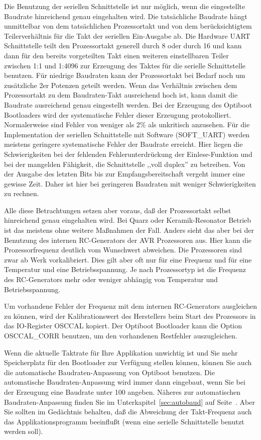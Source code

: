 Die Benutzung der seriellen Schnittstelle ist nur möglich, wenn die eingestellte Baudrate
hinreichend genau eingehalten wird. Die tatsächliche Baudrate hängt unmittelbar von dem tatsächlichen
Prozessortakt und von dem berücksichtigtem Teilerverhältnis für die Takt der seriellen Ein-Ausgabe ab.
Die Hardware UART Schnittstelle teilt den Prozessortakt generell durch 8 oder durch 16 und kann
dann für den bereits vorgeteilten Takt einen weiteren einstellbaren Teiler zwischen 1:1 und 1:4096  
zur Erzeugung des Taktes für die serielle Schnittstelle benutzen. Für niedrige Baudraten kann der
Prozessortakt bei Bedarf noch um zusätzliche 2er Potenzen geteilt werden.
Wenn das Verhältnis zwischen dem Prozessortakt zu dem Baudraten-Takt ausreichend hoch ist, kann damit
die Baudrate ausreichend genau eingestellt werden. Bei der Erzeugung des Optiboot Bootloaders
wird der systematische Fehler dieser Erzeugung protokolliert.
Normalerweise sind Fehler von weniger als 2\%  als unkritisch anzusehen.
Für die Implementation der seriellen Schnittstelle mit Software (SOFT\_UART) werden meistens geringere
systematische Fehler der Baudrate erreicht. Hier liegen die Schwierigkeiten bei der fehlenden
Fehlerunterdrückung der Einlese-Funktion und bei der mangelden Fähigkeit, die Schnittstelle
,,voll duplex'' zu betreiben. Von der Ausgabe des letzten Bits bis zur Empfangsbereitschaft vergeht immer
eine gewisse Zeit. Daher ist hier bei geringeren Baudraten mit weniger Schwierigkeiten zu rechnen.

Alle diese Betrachtungen setzen aber voraus, daß der Prozessortakt selbst hinreichend genau eingehalten wird.
Bei Quarz oder Keramik-Resonator Betrieb ist das meistens ohne weitere Maßnahmen der Fall.
Anders sieht das aber bei der Benutzung des internen RC-Generators der AVR Prozessoren aus.
Hier kann die Prozessorfrequenz deutlich vom Wunschwert abweichen. Die Prozessoren sind zwar ab Werk
vorkalibriert. Dies gilt aber oft nur für eine Frequenz und für eine Temperatur und eine Betriebsspannung.
Je nach Prozessortyp ist die Frequenz des RC-Generators mehr oder weniger abhängig von Temperatur
und Betriebsspannung.

Um vorhandene Fehler der Frequenz mit dem internen RC-Generators ausgleichen zu können,
wird der Kalibrationswert des Herstellers beim Start des Prozessors in das IO-Register OSCCAL kopiert.
Der Optiboot Bootloader kann die Option OSCCAL\_CORR benutzen, um den vorhandenen Restfehler
auszugleichen.

Wenn die aktuelle Taktrate für Ihre Applikation unwichtig ist und
Sie mehr Speicherplatz für den Bootloader zur Verfügung stellen können,
können Sie auch die automatische Baudraten-Anpassung von Optiboot benutzen.
Die automatische Baudraten-Anpassung wird immer dann eingebaut,
wenn Sie bei der Erzeugung eine Baudrate unter 100 angeben.
Näheres zur automatischen Baudraten-Anpassung finden Sie
im Unterkapitel~\ref{sec:autobaud} auf Seite~\pageref{sec:autobaud}.
Aber Sie sollten im Gedächtnis behalten, daß die Abweichung der Takt-Frequenz
auch das Applikationsprogramm beeinflußt (wenn eine serielle Schnittstelle benutzt werden soll).

